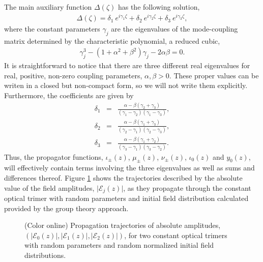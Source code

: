 \documentclass[9pt,twocolumn,twoside]{osajnl}
\begin{document}
The main auxiliary function $\Delta(\zeta)$ has the following solution,
\begin{eqnarray}
\Delta(\zeta) = \delta_{1} \: e^{i \gamma_1 \zeta} + \delta_{2} \: e^{i \gamma_2 \zeta} +  \delta_{3} \: e^{i \gamma_3 \zeta},
\end{eqnarray}  
where the constant parameters  $\gamma_{j}$ are the eigenvalues of the mode-coupling matrix determined by the characteristic polynomial, a reduced cubic,
\begin{eqnarray}
\gamma_{j}^{3} - (1+ \alpha^{2} + \beta^{2}) \gamma_{j} - 2 \alpha \beta = 0. \label{eq:poly}
\end{eqnarray}
It is straightforward to notice that there are three different real eigenvalues for real, positive, non-zero coupling parameters, $\alpha, \beta > 0$.
These proper values can be writen in a closed but non-compact form, so we will not write them explicitly.
Furthermore, the coefficients are given by
\begin{eqnarray}
\delta_{1} &=& \frac{\alpha-\beta(\gamma_2+\gamma_3)}{(\gamma_1-\gamma_2)(\gamma_1-\gamma_3)},\\
\delta_{2} &=& \frac{\alpha-\beta(\gamma_1+\gamma_3)}{(\gamma_2-\gamma_1)(\gamma_2-\gamma_3)},\\
\delta_{3} &=& \frac{\alpha-\beta(\gamma_1+\gamma_2)}{(\gamma_3-\gamma_1)(\gamma_3-\gamma_2)}. 
\end{eqnarray}  
Thus, the propagator functions, $\iota_{\pm}(z)$, $\mu_{\pm}(z)$, $\nu_{\pm}(z)$, $\iota_{0}(z)$ and $y_{0}(z)$, will effectively contain terms involving the three eigenvalues as well as sums and differences thereof.
Figure \ref{fig: Fig3} shows the trajectories described by the absolute value of the field amplitudes, $\vert \mathcal{E}_{j}(z)\vert$, as they propagate through the constant optical trimer with random parameters and initial field distribution calculated provided by the group theory approach.

\begin{figure}[htbp]
\centering
{}
\caption{(Color online) Propagation trajectories of absolute amplitudes, $(\vert \mathcal{E}_{0}(z) \vert, \vert \mathcal{E}_{1}(z) \vert, \vert \mathcal{E}_{2}(z) \vert )$, for two constant optical trimers with random parameters and random normalized initial field distributions.}
\label{fig: Fig3}
\end{figure}
\end{document}
